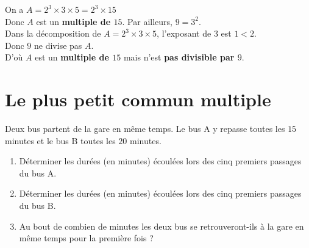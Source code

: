 \documentclass[10pt, a4paper]{article}
\begin{document}
\begin{Solution}[APPLICATION][9]
\begin{enumerate}[leftmargin=*,itemsep=0.5pt]
    On a $A = 2^3 \times 3 \times 5 = 2^3 \times 15$ \\
    Donc $A$ est un \textbf{multiple de $15$}. Par ailleurs, $9 = 3^2$. \\
    Dans la décomposition de $A = 2^3 \times 3 \times 5$, l'exposant de $3$ est $1 < 2$. \\
    Donc $9$ ne divise pas $A$. \\
    D'où $A$ est un \textbf{multiple de $15$} mais n'est \textbf{pas divisible par $9$}.
\end{enumerate}
\end{Solution}



\section{Le plus petit commun multiple }


\begin{Activite}[][10 min]
Deux bus partent de la gare en même temps.
Le bus A y repasse toutes les $15$ minutes et le bus B toutes les $20$ minutes.

\begin{enumerate}[leftmargin=*,itemsep=0.5pt]
    \item Déterminer les durées (en minutes) écoulées lors des cinq premiers passages du bus A.
    \item Déterminer les durées (en minutes) écoulées lors des cinq premiers passages du bus B.
    \item Au bout de combien de minutes les deux bus se retrouveront-ils à la gare en même temps pour la première fois ?
\end{enumerate}
\end{Activite}
\end{document}
